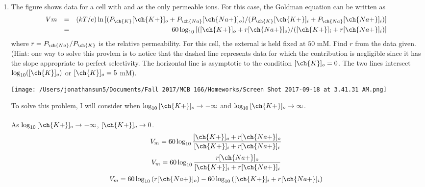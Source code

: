 \documentclass[11pt]{article}
\begin{document}
\begin{enumerate}[label=\arabic*.]
\newpage
\item
The figure shows data for a cell with  and  as the only permeable ions. For this case, the Goldman equation can be written as \\
\begin{align*}
Vm && = && (kT/e) \ln{[(P_{\ch{K}}[\ch{K+}]_o + P_{\ch{Na}}[\ch{Na+}]_o) / (P_{\ch{K}}[\ch{K+}]_i + P_{\ch{Na}}[\ch{Na+}]_i)]} \\
&& = && 60\log_{10}{[([\ch{K+}]_o + r[\ch{Na+}]_o) / ([\ch{K+}]_i + r[\ch{Na+}]_i)]}
\end{align*}
where $r = P_{\ch{Na}} / P_{\ch{K}}$ is the relative permeability. For this cell, the external  is held fixed at $50$ mM. Find $r$ from the data given. (Hint: one way to solve this provlem is to notice that the dashed line represents data for which the  contribution is negligible since it has the slope appropriate to perfect  selectivity. The horizontal line is asymptotic to the condition $[\ch{K}]_o = 0$. The two lines intersect $\log_{10}([\ch{K}]_o)$ or $[\ch{K}]_o = 5$ mM).
\begin{center}
\texttt{[image: /Users/jonathansun5/Documents/Fall 2017/MCB 166/Homeworks/Screen Shot 2017-09-18 at 3.41.31 AM.png]}
\end{center}
To solve this problem, I will consider when $\log_{10}{[\ch{K+}]_o} \to -\infty$ and $\log_{10}{[\ch{K+}]_o} \to \infty$.
\vspace*{1\baselineskip}
\\
 \\
As $\log_{10}{[\ch{K+}]_o} \to -\infty$, $[\ch{K+}]_o \to 0$.
\begin{align*}
V_m = 60\log_{10}{\frac{[\ch{K+}]_o + r[\ch{Na+}]_o} {[\ch{K+}]_i + r[\ch{Na+}]_i}}
\end{align*}
\begin{align*}
V_m = 60\log_{10}{\frac{r[\ch{Na+}]_o} {[\ch{K+}]_i + r[\ch{Na+}]_i}}
\end{align*}
\begin{align*}
V_m = 60\log_{10}{(r[\ch{Na+}]_o)} - 60\log_{10}{([\ch{K+}]_i + r[\ch{Na+}]_i)}
\end{align*}


\end{enumerate}
\end{document}

